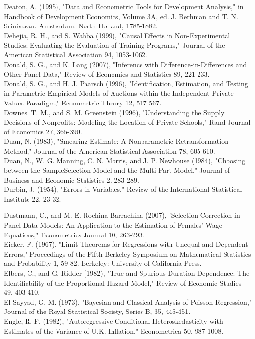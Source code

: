 \documentclass[10pt]{article}
\begin{document}
Deaton, A. (1995), "Data and Econometric Tools for Development Analysis," in Handbook of Development Economics, Volume 3A, ed. J. Berhman and T. N. Srinivasan. Amsterdam: North Holland, 1785-1882.\\
Dehejia, R. H., and S. Wahba (1999), "Causal Effects in Non-Experimental Studies: Evaluating the Evaluation of Training Programs," Journal of the American Statistical Association 94, 1053-1062.\\
Donald, S. G., and K. Lang (2007), "Inference with Difference-in-Differences and Other Panel Data," Review of Economics and Statistics 89, 221-233.\\
Donald, S. G., and H. J. Paarsch (1996), "Identification, Estimation, and Testing in Parametric Empirical Models of Auctions within the Independent Private Values Paradigm," Econometric Theory 12, 517-567.\\
Downes, T. M., and S. M. Greenstein (1996), "Understanding the Supply Decisions of Nonprofits: Modeling the Location of Private Schools," Rand Journal of Economics 27, 365-390.\\
Duan, N. (1983), "Smearing Estimate: A Nonparametric Retransformation Method," Journal of the American Statistical Association 78, 605-610.\\
Duan, N., W. G. Manning, C. N. Morris, and J. P. Newhouse (1984), "Choosing between the SampleSelection Model and the Multi-Part Model," Journal of Business and Economic Statistics 2, 283-289.\\
Durbin, J. (1954), "Errors in Variables," Review of the International Statistical Institute 22, 23-32.

Dustmann, C., and M. E. Rochina-Barrachina (2007), "Selection Correction in Panel Data Models: An Application to the Estimation of Females' Wage Equations," Econometrics Journal 10, 263-293.\\
Eicker, F. (1967), "Limit Theorems for Regressions with Unequal and Dependent Errors," Proceedings of the Fifth Berkeley Symposium on Mathematical Statistics and Probability 1, 59-82. Berkeley: University of California Press.\\
Elbers, C., and G. Ridder (1982), "True and Spurious Duration Dependence: The Identifiability of the Proportional Hazard Model," Review of Economic Studies 49, 403-410.\\
El Sayyad, G. M. (1973), "Bayesian and Classical Analysis of Poisson Regression," Journal of the Royal Statistical Society, Series B, 35, 445-451.\\
Engle, R. F. (1982), "Autoregressive Conditional Heteroskedasticity with Estimates of the Variance of U.K. Inflation," Econometrica 50, 987-1008.
\end{document}
